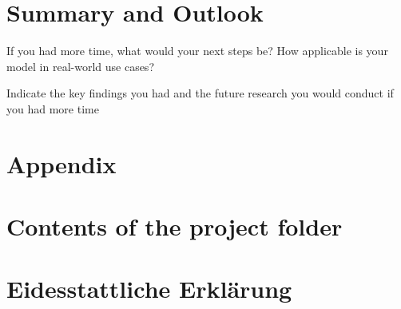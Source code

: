 \documentclass[12pt]{report}
\begin{document}
\chapter{Summary and Outlook}
If you had more time, what would your next steps be? How applicable
is your model in real-world use cases?

Indicate the key findings you had and the future research you would
conduct if you had more time

\chapter{Appendix}
\printbibliography
\renewcommand{\thechapter}{\Roman{chapter}}
\setcounter{chapter}{2}
\chapter{Contents of the project folder}
\chapter{Eidesstattliche Erklärung}
\end{document}
